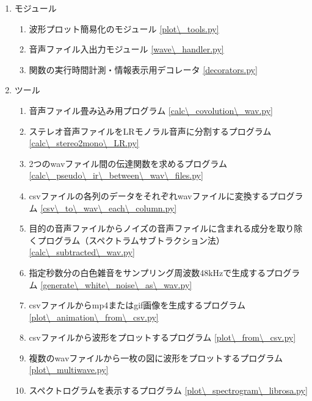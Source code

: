 \begin{enumerate}
\renewcommand{\labelenumi}{(\arabic{enumi})}
\item
  モジュール

  \begin{enumerate}
  \renewcommand{\labelenumi}{(\arabic{enumi})}
  \item
    波形プロット簡易化のモジュール \ref{plot\_tools.py}

  \item
    音声ファイル入出力モジュール  \ref{wave\_handler.py}

  \item
    関数の実行時間計測・情報表示用デコレータ \ref{decorators.py}

  \end{enumerate}

\item
  ツール

  \begin{enumerate}
  \renewcommand{\labelenumi}{(\arabic{enumi})}
  \item
    音声ファイル畳み込み用プログラム \ref{calc\_covolution\_wav.py}

  \item
    ステレオ音声ファイルをLRモノラル音声に分割するプログラム \ref{calc\_stereo2mono\_LR.py}

  \item
    2つのwavファイル間の伝達関数を求めるプログラム \ref{calc\_pseudo\_ir\_between\_wav\_files.py}

  \item
    csvファイルの各列のデータをそれぞれwavファイルに変換するプログラム \ref{csv\_to\_wav\_each\_column.py}

  \item
    目的の音声ファイルからノイズの音声ファイルに含まれる成分を取り除くプログラム（スペクトラムサブトラクション法） \ref{calc\_subtracted\_wav.py}

  \item
    指定秒数分の白色雑音をサンプリング周波数48kHzで生成するプログラム \ref{generate\_white\_noise\_as\_wav.py}

  \item
    csvファイルからmp4またはgif画像を生成するプログラム \ref{plot\_animation\_from\_csv.py}

  \item
    csvファイルから波形をプロットするプログラム \ref{plot\_from\_csv.py}

  \item
    複数のwavファイルから一枚の図に波形をプロットするプログラム \ref{plot\_multiwave.py}

  \item
    スペクトログラムを表示するプログラム \ref{plot\_spectrogram\_librosa.py}

  \end{enumerate}
\end{enumerate}

